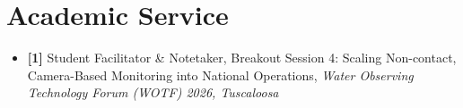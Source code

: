 \section{Academic Service}
\vspace{-1.5em}
\begin{itemize}
    \item[]\textbf{[1]} Student Facilitator \& Notetaker, Breakout Session 4: Scaling Non-contact, Camera-Based Monitoring into National Operations, \textit{Water Observing Technology Forum (WOTF) 2026, Tuscaloosa}
\end{itemize}